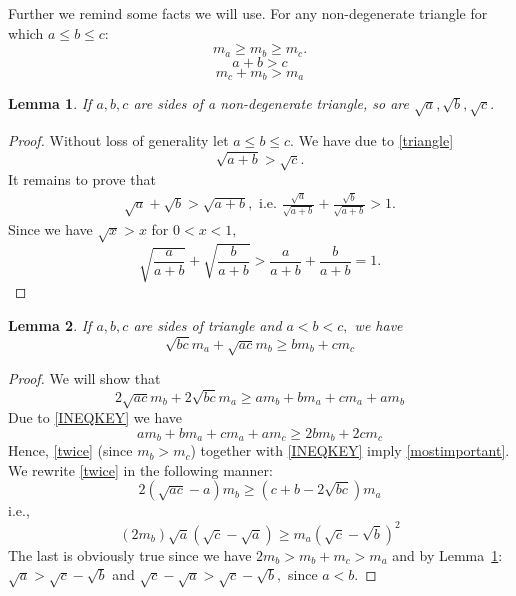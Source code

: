 \documentclass[a4paper,12pt]{article}
\newtheorem{lemma}{Lemma}
\begin{document}
Further we remind some facts we will use. For any non-degenerate triangle for which $a\leq b \leq c:$ 
\begin{equation}\label{abcmambmc}
m_a \geq m_b \geq m_c.
\end{equation}
\begin{equation}\label{triangle}
a+b >c 
\end{equation}
\begin{equation}\label{trianglemed}
m_c+m_b >m_a 
\end{equation}
\begin{lemma}\label{squareroot}
If $a,b,c$ are sides of a non-degenerate triangle, so are $\sqrt{a},\sqrt{b},\sqrt{c}.$
\end{lemma}
\begin{proof}Without loss of generality let $a \leq b \leq c.$ We have due to \eqref{triangle}
\[
\sqrt{a+b} > \sqrt{c}.
\]
It remains to prove that 
\begin{align*}
\sqrt{a}+\sqrt{b} > \sqrt{a+b}, \text{ i.e. }
\frac{\sqrt{a}}{\sqrt{a+b}}+\frac{\sqrt{b}}{\sqrt{a+b}} > 1.
\end{align*}
Since we have $\sqrt{x}>x$ for $0<x<1,$
\[
\sqrt{\frac{a}{a+b}}+\sqrt{\frac{b}{a+b}} > \frac{a}{a+b}+\frac{b}{a+b}=1.
\]
\end{proof}

\begin{lemma}\label{scalenetriangle}
If $a,b,c$ are sides of triangle and $a < b < c,$ we have 
\begin{equation}\label{mostimportant}
\sqrt{bc}m_a+\sqrt{ac}m_b \geq b m_b+ c m_c
\end{equation}
\end{lemma}
\begin{proof}
We will show that
\begin{equation}\label{twice}
2\sqrt{ac}m_b+2\sqrt{bc}m_a \geq a m_b +b m_a+ c m_a+a m_b 
\end{equation}
Due to \eqref{INEQKEY} we have
\[
a m_b +b m_a+ c m_a+a m_c \geq 2b m_b+2c m_c
\]
Hence, \eqref{twice} (since $m_b > m_c$) together with \eqref{INEQKEY} imply \eqref{mostimportant}.
We rewrite \eqref{twice} in the following manner:
\[
2(\sqrt{ac}-a)m_b \geq (c+b-2\sqrt{bc})m_a  \]
i.e.,
\[
(2m_b) \sqrt{a}(\sqrt{c}-\sqrt{a}) \geq m_a (\sqrt{c}-\sqrt{b})^2
\]
The last is obviously true since we have $2m_b>m_b+m_c >m_a$ and by Lemma~\ref{squareroot}: $\sqrt{a} > \sqrt{c} -\sqrt{b} $ and $\sqrt{c}-\sqrt{a} > \sqrt{c} - \sqrt{b},$ since $a<b.$
\end{proof}
 
\end{document}
